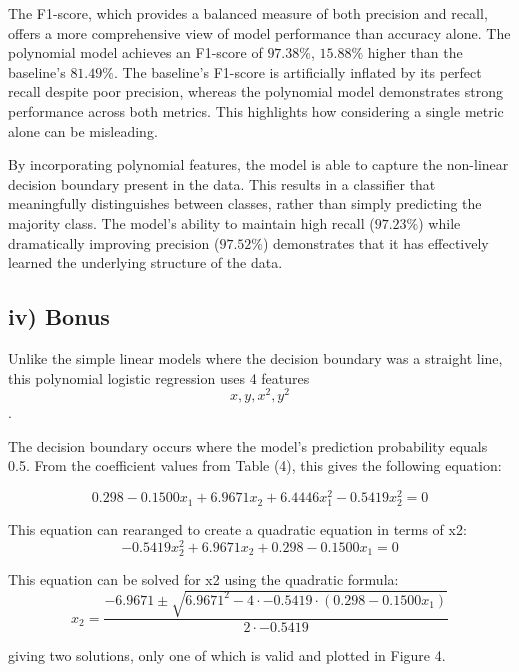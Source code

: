 The F1-score, which provides a balanced measure of both precision and recall, offers a more comprehensive view of model performance than accuracy alone. The polynomial model achieves an F1-score of $97.38\%$, $15.88\%$ higher than the baseline's $81.49\%$. The baseline's F1-score is artificially inflated by its perfect recall despite poor precision, whereas the polynomial model demonstrates strong performance across both metrics. This highlights how considering a single metric alone can be misleading.

By incorporating polynomial features, the model is able to capture the non-linear decision boundary present in the data. This results in a classifier that meaningfully distinguishes between classes, rather than simply predicting the majority class. The model's ability to maintain high recall ($97.23\%$) while dramatically improving precision ($97.52\%$) demonstrates that it has effectively learned the underlying structure of the data.

\subsection{iv) Bonus}
Unlike the simple linear models where the decision boundary was a straight line, this polynomial logistic regression uses 4 features 
\[x, y, x^2, y^2\].  

The decision boundary occurs where the model's prediction probability equals 0.5. From the coefficient values from Table (4), this gives the following equation: 

\begin{equation}
    0.298 - 0.1500x_1 + 6.9671x_2 + 6.4446x_1^2 - 0.5419x_2^2 = 0
\end{equation}

This equation can rearanged to create a quadratic equation in terms of x2:
\begin{equation}
    -0.5419x_2^2 + 6.9671x_2 + 0.298 - 0.1500x_1 = 0
\end{equation}

This equation can be solved for x2 using the quadratic formula:
\begin{equation}
    x_2 = \frac{-6.9671 \pm \sqrt{6.9671^2 - 4 \cdot -0.5419 \cdot (0.298 - 0.1500x_1)}}{2 \cdot -0.5419}
\end{equation}

giving two solutions, only one of which is valid and plotted in Figure 4.
